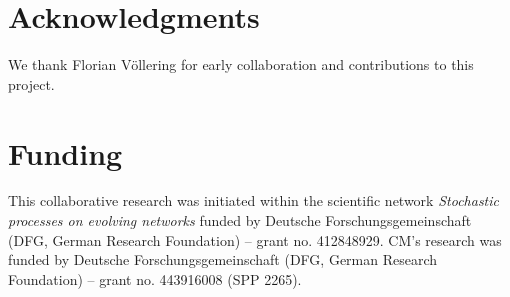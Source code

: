 \documentclass[11pt,a4paper]{scrartcl}
\numberwithin{equation}{section}
\theoremstyle{plain}
\theoremstyle{definition}
\theoremstyle{remark}
\begin{document}
\section*{Acknowledgments}
We thank Florian V\"ollering for early collaboration and contributions to this project.

\section*{Funding}
This collaborative research was initiated within the scientific network \emph{Stochastic processes on evolving networks} funded by Deutsche Forschungsgemeinschaft (DFG, German Research Foundation) -- grant no. 412848929. CM's research was funded by Deutsche Forschungsgemeinschaft (DFG, German Research Foundation) -- grant no. 443916008 (SPP 2265).



\end{document}
